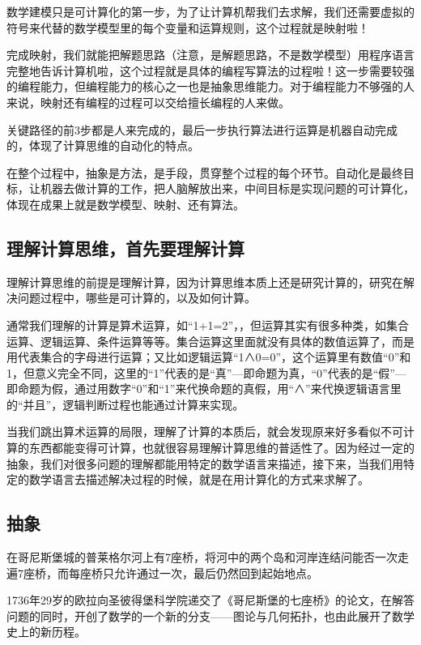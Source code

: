 数学建模只是可计算化的第一步，为了让计算机帮我们去求解，我们还需要虚拟的符号来代替的数学模型里的每个变量和运算规则，这个过程就是映射啦！

完成映射，我们就能把解题思路（注意，是解题思路，不是数学模型）用程序语言完整地告诉计算机啦，这个过程就是具体的编程写算法的过程啦！这一步需要较强的编程能力，但编程能力的核心之一也是抽象思维能力。对于编程能力不够强的人来说，映射还有编程的过程可以交给擅长编程的人来做。

关键路径的前3步都是人来完成的，最后一步执行算法进行运算是机器自动完成的，体现了计算思维的自动化的特点。

在整个过程中，抽象是方法，是手段，贯穿整个过程的每个环节。自动化是最终目标，让机器去做计算的工作，把人脑解放出来，中间目标是实现问题的可计算化，体现在成果上就是数学模型、映射、还有算法。


\subsection{理解计算思维，首先要理解计算}

理解计算思维的前提是理解计算，因为计算思维本质上还是研究计算的，研究在解决问题过程中，哪些是可计算的，以及如何计算。

通常我们理解的计算是算术运算，如“1+1=2”，，但运算其实有很多种类，如集合运算、逻辑运算、条件运算等等。集合运算这里面就没有具体的数值运算了，而是用代表集合的字母进行运算；又比如逻辑运算“1∧0=0”，这个运算里有数值“0”和1，但意义完全不同，这里的“1”代表的是“真”—即命题为真，“0”代表的是“假”—即命题为假，通过用数字“0”和“1”来代换命题的真假，用“∧”来代换逻辑语言里的“并且”，逻辑判断过程也能通过计算来实现。

当我们跳出算术运算的局限，理解了计算的本质后，就会发现原来好多看似不可计算的东西都能变得可计算，也就很容易理解计算思维的普适性了。因为经过一定的抽象，我们对很多问题的理解都能用特定的数学语言来描述，接下来，当我们用特定的数学语言去描述解决过程的时候，就是在用计算化的方式来求解了。

\subsection{抽象}

在哥尼斯堡城的普莱格尔河上有7座桥，将河中的两个岛和河岸连结问能否一次走遍7座桥，而每座桥只允许通过一次，最后仍然回到起始地点。

1736年29岁的欧拉向圣彼得堡科学院递交了《哥尼斯堡的七座桥》的论文，在解答问题的同时，开创了数学的一个新的分支——图论与几何拓扑，也由此展开了数学史上的新历程。

